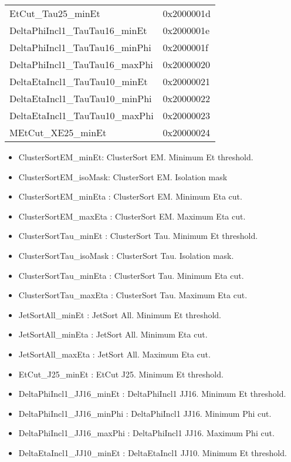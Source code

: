 \begin {table}[H]
\begin{tabular}{|l|l|}
EtCut\_Tau25\_minEt & 0x2000001d \\ 
DeltaPhiIncl1\_TauTau16\_minEt & 0x2000001e \\ 
DeltaPhiIncl1\_TauTau16\_minPhi & 0x2000001f \\ 
DeltaPhiIncl1\_TauTau16\_maxPhi & 0x20000020 \\ 
DeltaEtaIncl1\_TauTau10\_minEt & 0x20000021 \\ 
DeltaEtaIncl1\_TauTau10\_minPhi & 0x20000022 \\ 
DeltaEtaIncl1\_TauTau10\_maxPhi & 0x20000023 \\ 
MEtCut\_XE25\_minEt & 0x20000024 \\ 
\hline
\end{tabular}
\end{table}

\begin{itemize}
 \item ClusterSortEM\_minEt: ClusterSort EM. Minimum Et threshold.
 \item ClusterSortEM\_isoMask: ClusterSort EM. Isolation mask
 \item ClusterSortEM\_minEta : ClusterSort EM. Minimum Eta cut.
 \item ClusterSortEM\_maxEta : ClusterSort EM. Maximum Eta cut.
 \item ClusterSortTau\_minEt : ClusterSort Tau. Minimum Et threshold.
 \item ClusterSortTau\_isoMask : ClusterSort Tau. Isolation mask.
 \item ClusterSortTau\_minEta : ClusterSort Tau. Minimum Eta cut.
 \item ClusterSortTau\_maxEta : ClusterSort Tau. Maximum Eta cut.
 \item JetSortAll\_minEt : JetSort All. Minimum Et threshold.
 \item JetSortAll\_minEta : JetSort All. Minimum Eta cut.
 \item JetSortAll\_maxEta : JetSort All. Maximum Eta cut.
 \item EtCut\_J25\_minEt : EtCut J25. Minimum Et threshold.
 \item DeltaPhiIncl1\_JJ16\_minEt : DeltaPhiIncl1 JJ16. Minimum Et threshold.
 \item DeltaPhiIncl1\_JJ16\_minPhi : DeltaPhiIncl1 JJ16. Minimum Phi cut.
 \item DeltaPhiIncl1\_JJ16\_maxPhi : DeltaPhiIncl1 JJ16. Maximum Phi cut.
 \item DeltaEtaIncl1\_JJ10\_minEt : DeltaEtaIncl1 JJ10. Minimum Et threshold.

\end{itemize}
